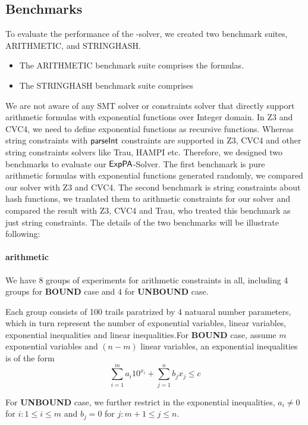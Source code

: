 \subsection{Benchmarks}

To evaluate the performance of the {\paexp}-solver, we created two benchmark suites, ARITHMETIC, and STRINGHASH.
\begin{itemize}
\item The ARITHMETIC benchmark suite comprises the {\paexp} formulas.
%
\item The STRINGHASH benchmark suite comprises 
\end{itemize}


We are not aware of any SMT solver or constraints solver that directly support arithmetic formulas with exponential functions over Integer domain. In Z3 and CVC4, we need to define exponential functions as recursive functions. Whereas string constraints with $\textsf{parseInt}$ constraints are supported in Z3, CVC4 and other string constraints solvers like Trau, HAMPI etc. Therefore, we designed two benchmarks to evaluate our ${\sf ExpPA}$-Solver. The first benchmark is pure arithmetic formulas with exponential functions generated randomly, we compared our solver with Z3 and CVC4. The second benchmark is string constraints about hash functions, we tranlated them to arithmetic constraints for our solver and compared the result with Z3, CVC4 and Trau, who treated this benchmark as just string constraints. The details of the two benchmarks will be illustrate following:

\paragraph{arithmetic}

We have 8 groups of experiments for arithmetic constraints in all, including 4 groups for \textbf{BOUND} case and 4 for \textbf{UNBOUND} case.

Each group consists of 100 trails paratrized by 4 natuaral number parameters, which in turn represent the number of exponential variables, linear variables, exponential inequalities and linear inequalities.For \textbf{BOUND} case, assume $m$ exponential variables and $(n-m)$ linear variables, an exponential inequalities is of the form
$$\sum_{i=1}^m a_i 10^{x_i} + \sum_{j=1}^n b_j x_j \le c$$

For \textbf{UNBOUND} case, we further restrict in the exponential inequalities, $a_i\neq 0$ for $i:1\le i\le m$ and $b_j=0$ for $j:m+1\le j \le n$.

